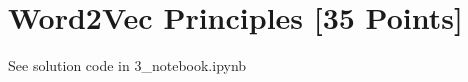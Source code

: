 \begin{solution}




 
\end{solution}






\newpage
\section{Word2Vec Principles [35 Points]}

\problem[5]


\begin{solution}

\end{solution}


\newpage
\problem[10]

\begin{solution}

\end{solution}


\newpage
\problem[3]


\begin{solution}

\end{solution}




\newpage
\problem[10]



\begin{solution}
See solution code in 3_notebook.ipynb
\end{solution}


\newpage
\problem[2]


\begin{solution}

\end{solution}

\newpage
\problem[2]

\begin{solution}

\end{solution}

\newpage
\problem[1]

\begin{solution}

%

\end{solution}
\newpage

\problem[2]

\begin{solution}


\end{solution}



